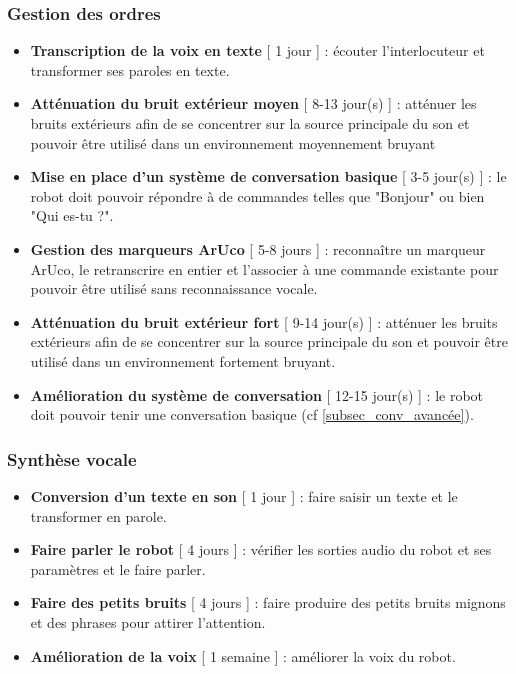 \subsubsection{Gestion des ordres}
\begin{itemize}
    \item \textbf{Transcription de la voix en texte} [ 1 jour ] : écouter l'interlocuteur et transformer ses paroles en texte.
    \item \textbf{Atténuation du bruit extérieur moyen} [ 8-13 jour(s) ] : atténuer les bruits extérieurs afin de se concentrer sur la source principale du son et pouvoir être utilisé dans un environnement moyennement bruyant
    \item \textbf{Mise en place d'un système de conversation basique} [ 3-5 jour(s) ] : le robot doit pouvoir répondre à de commandes telles que "Bonjour" ou bien "Qui es-tu ?".
    \item \textbf{Gestion des marqueurs ArUco} [ 5-8 jours ] : reconnaître un marqueur ArUco, le retranscrire en entier et l'associer à une commande existante pour pouvoir être utilisé sans reconnaissance vocale.
    \item \textbf{Atténuation du bruit extérieur fort} [ 9-14 jour(s) ] : atténuer les bruits extérieurs afin de se concentrer sur la source principale du son et pouvoir être utilisé dans un environnement fortement bruyant.
    \item \textbf{Amélioration du système de conversation} [ 12-15 jour(s) ] : le robot doit pouvoir tenir une conversation basique (cf \ref{subsec_conv_avancée}).
\end{itemize}

\subsubsection{Synthèse vocale}
\begin{itemize}
    \item \textbf{Conversion d'un texte en son} [ 1 jour ] : faire saisir un texte et le transformer en parole.
    \item \textbf{Faire parler le robot} [ 4 jours ] : vérifier les sorties audio du robot et ses paramètres et le faire parler.
    \item \textbf{Faire des petits bruits} [ 4 jours ] : faire produire des petits bruits mignons et des phrases pour attirer l'attention. 
    \item \textbf{Amélioration de la voix} [ 1 semaine ] : améliorer la voix du robot.
\end{itemize}

